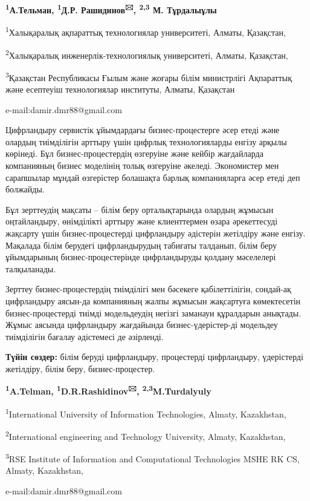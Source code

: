\begin{center}

{\bfseries \textsuperscript{1}А.Тельман, \textsuperscript{1}Д.Р. Рашидинов\textsuperscript{🖂}, \textsuperscript{2,3} М. Тұрдалыұлы}

\textsuperscript{1}Халықаралық ақпараттық технологиялар университеті, Алматы, Қазақстан,

\textsuperscript{2}Халықаралық инженерлік-технологиялық университеті, Алматы, Қазақстан,

\textsuperscript{3}Қазақстан Республикасы Ғылым және жоғары білім министрлігі Ақпараттық
және есептеуіш технологиялар институты, Алматы, Қазақстан

e-mail:damir.dmr88@gmail.com
\end{center}

Цифрландыру сервистік ұйымдардағы бизнес-процестерге әсер етеді және
олардың тиімділігін арттыру үшін цифрлық технологияларды енгізу арқылы
көрінеді. Бұл бизнес-процестердің өзгеруіне және кейбір жағдайларда
компанияның бизнес моделінің толық өзгеруіне әкеледі. Экономистер мен
сарапшылар мұндай өзгерістер болашақта барлық компанияларға әсер етеді
деп болжайды.

Бұл зерттеудің мақсаты -- білім беру орталықтарында олардың жұмысын
оңтайландыру, өнімділікті арттыру және клиенттермен өзара әрекеттесуді
жақсарту үшін бизнес-процестерді цифрландыру әдістерін жетілдіру және
енгізу. Мақалада білім берудегі цифрландырудың табиғаты талданып, білім
беру ұйымдарының бизнес-процестерінде цифрландыруды қолдану мәселелері
талқыланады.

Зерттеу бизнес-процестердің тиімділігі мен бәсекеге қабілеттілігін,
сондай-ақ цифрландыру аясын-да компанияның жалпы жұмысын жақсартуға
көмектесетін бизнес-процестерді тиімді модельдеудің негізгі заманауи
құралдарын анықтады. Жұмыс аясында цифрландыру жағдайында
бизнес-үдерістер-ді модельдеу тиімділігін бағалау әдістемесі де
әзірленді.

{\bfseries Түйін сөздер:} білім беруді цифрландыру, процестерді
цифрландыру, үдерістерді жетілдіру, білім беру, бизнес-процестер.

\begin{center}

{\bfseries \textsuperscript{1}A.Telman, \textsuperscript{1}D.R.Rashidinov\textsuperscript{🖂}, \textsuperscript{2,3}M.Turdalyuly}

\textsuperscript{1}International University of Information Technologies, Almaty, Kazakhstan,

\textsuperscript{2}International engineering and Technology University, Almaty, Kazakhstan,

\textsuperscript{3}RSE Institute of Information and Computational Technologies MSHE RK CS, Almaty, Kazakhstan,

e-mail:damir.dmr88@gmail.com
\end{center}

